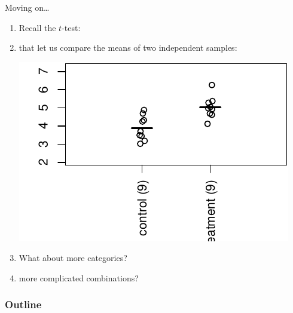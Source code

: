 %
%
%



\subtitle{or, ANOVA}

\date{19 November 2013}




\begin{frame}
  \maketitle
\end{frame}


\begin{frame}{Moving on\ldots}
  \begin{enumerate}
    \item Recall the $t$-test:
    \item that let us \alert{compare the means} of two independent samples:
      \begin{center}
        \includegraphics{dots1ex}
      \end{center}
    \item What about more categories?
    \item more complicated combinations?
  \end{enumerate}

\end{frame}

\begin{frame}\frametitle<presentation>{Outline}
  \tableofcontents
\end{frame}


